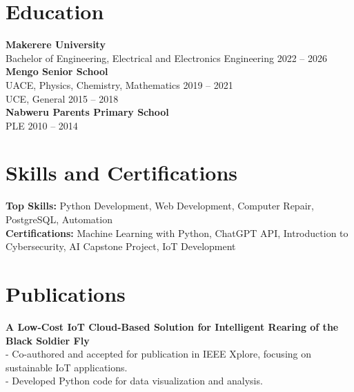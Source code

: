\documentclass[a4paper,10pt]{article}
\begin{document}
\section*{Education}
\textbf{Makerere University}\\
Bachelor of Engineering, Electrical and Electronics Engineering \hfill 2022 -- 2026\\
\textbf{Mengo Senior School}\\
UACE, Physics, Chemistry, Mathematics \hfill 2019 -- 2021\\
UCE, General \hfill 2015 -- 2018\\
\textbf{Nabweru Parents Primary School}\\
PLE \hfill 2010 -- 2014

\section*{Skills and Certifications}
\textbf{Top Skills:} Python Development, Web Development, Computer Repair, PostgreSQL, Automation\\
\textbf{Certifications:} Machine Learning with Python, ChatGPT API, Introduction to Cybersecurity, AI Capstone Project, IoT Development

\section*{Publications}
\textbf{A Low-Cost IoT Cloud-Based Solution for Intelligent Rearing of the Black Soldier Fly}\\
- Co-authored and accepted for publication in IEEE Xplore, focusing on sustainable IoT applications.\\
- Developed Python code for data visualization and analysis.
\end{document}
